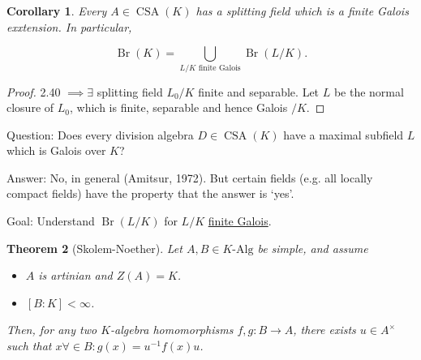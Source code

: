 \documentclass{article}
\theoremstyle{definition}
\theoremstyle{plain}
\newtheorem{theorem}{Theorem}[section]
\newtheorem{corollary}[theorem]{Corollary}
\theoremstyle{remark}
\begin{document}
    \begin{corollary}
        Every \(A \in \operatorname{CSA}(K)\) has a splitting field which is a finite Galois exxtension. In particular,

        \[
            \operatorname{Br}(K) = \bigcup_{L / K \text{ finite Galois}} \operatorname{Br}(L / K).
        \]
    \end{corollary}

    \begin{proof}
        2.40 \(\implies \exists\) splitting field \(L_0 / K\) finite and separable. Let \(L\) be the normal closure of \(L_0\), which is finite, separable and hence Galois \(/ K\).
    \end{proof}

    Question: Does every division algebra \(D \in \operatorname{CSA}(K)\) have a maximal subfield \(L\) which is Galois over \(K\)?

    Answer: No, in general (Amitsur, 1972). But certain fields (e.g. all locally compact fields) have the property that the answer is `yes'.

    Goal: Understand \(\operatorname{Br}(L / K)\) for \(L / K\) \underline{finite Galois}.

    \begin{theorem}
        [Skolem-Noether]

        Let \(A, B \in K\text{-Alg}\) be simple, and assume

        \begin{itemize}
            \item \(A\) is artinian and \(Z(A) = K\).
            \item \([B:K] < \infty\). 
        \end{itemize} 

        Then, for any two \(K\)-algebra homomorphisms \(f,g : B \to A\), there exists \(u\in A^\times\) such that \(x\forall \in B: g(x) = u ^{-1} f(x) u\).

    \end{theorem}
\end{document}
